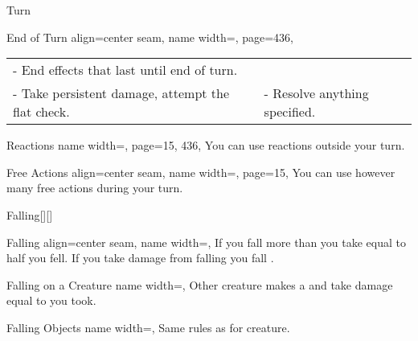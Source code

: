 \begin{PageBack}
\begin{Tables}{\backTableHeight}
\begin{Table}{Turn}
\begin{entry}{End of Turn}{%
                align=center seam,
                name width=\turnLength,%
                page=436,
            }
\begin{tabular}{@{}ll}
                    - End effects that last until end of turn. \\%
                    - Take persistent damage, attempt the flat check. &
                    - Resolve anything specified.
                \end{tabular}%
            \end{entry}
            \begin{entry}{Reactions}{%
                name width=\turnLength,%
                page={15, 436},
            }
                You can use reactions  outside your turn. \hfill
            \end{entry}
            \begin{entry}{Free Actions}{%
                align=center seam,
                name width=\turnLength,%
                page=15,
            }
                You can use however many free actions during your turn. \hfill
            \end{entry}
        \end{Table}\TableSpace
        \begin{Table}{Falling}[][]
            \begin{entry}{Falling}{%
                align=center seam,
                name width=\turnLength,}
                If you fall more than  \Feet you take  equal to half you fell.\hfill
                If you take damage from falling you fall \Prone.\\
            \end{entry}
            \begin{entry}{Falling on a Creature}{%
                name width=\turnLength,}
                Other creature makes a \Reflex[][val=15] and take damage equal to     you took.
            \end{entry}
            \begin{entry}{Falling Objects}{%
                name width=\turnLength,}
                Same rules as for creature. \hfill
            \end{entry}

\end{Table}
\end{Tables}
\end{PageBack}
